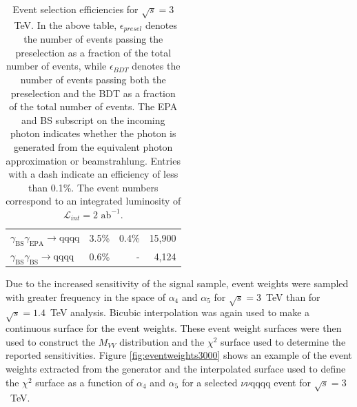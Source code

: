 \begin{table}[h!]
\begin{tabular}{ l r r r }
$\gamma_{\text{BS}}\gamma_{\text{EPA}} \rightarrow \text{qqqq}$ & 3.5\% & 0.4\% & 15,900 \\
$\gamma_{\text{BS}}\gamma_{\text{BS}} \rightarrow \text{qqqq}$ & 0.6\% & - & 4,124 \\
\hline
\end{tabular}
\caption[Event selection efficiencies for $\sqrt{s}=3$~TeV.  In the above table, $\epsilon_{presel}$ denotes the number of events passing the preselection as a fraction of the total number of events, while $\epsilon_{BDT}$ denotes the number of events passing both the preselection and the BDT as a fraction of the total number of events.  The EPA and BS subscript on the incoming photon indicates whether the photon is generated from the equivalent photon approximation or beamstrahlung.  Entries with a dash indicate an efficiency of less than 0.1\%.  The event numbers correspond to an integrated luminosity of $\mathcal{L}_{int} = 2\text{ ab}^{-1}$.]{Event selection efficiencies for $\sqrt{s}=3$~TeV.  In the above table, $\epsilon_{presel}$ denotes the number of events passing the preselection as a fraction of the total number of events, while $\epsilon_{BDT}$ denotes the number of events passing both the preselection and the BDT as a fraction of the total number of events.  The EPA and BS subscript on the incoming photon indicates whether the photon is generated from the equivalent photon approximation or beamstrahlung.  Entries with a dash indicate an efficiency of less than 0.1\%.  The event numbers correspond to an integrated luminosity of $\mathcal{L}_{int} = 2\text{ ab}^{-1}$.}
\label{table:selectionsummary3000GeV}
\end{table}

Due to the increased sensitivity of the signal sample, event weights were sampled with greater frequency in the space of $\alpha_{4}$ and $\alpha_{5}$ for $\sqrt{s}=3$~TeV than for $\sqrt{s}=1.4$~TeV analysis.  Bicubic interpolation was again used to make a continuous surface for the event weights.  These event weight surfaces were then used to construct the $M_{VV}$ distribution and the $\chi^{2}$ surface used to determine the reported sensitivities.  Figure \ref{fig:eventweights3000} shows an example of the event weights extracted from the generator and the interpolated surface used to define the $\chi^{2}$ surface as a function of $\alpha_{4}$ and $\alpha_{5}$ for a selected $\nu\nu\text{qqqq}$ event for $\sqrt{s}=3$~TeV.

